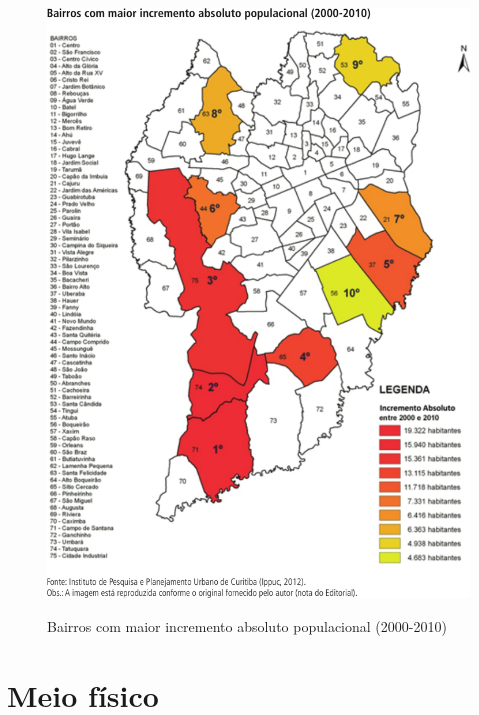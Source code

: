 	\begin{figure}
		\centering
		\caption{Bairros com maior incremento absoluto populacional (2000-2010)}
		\includegraphics[width=1.0\linewidth]{img/costa2015a_04}
		\label{fig:costa2015a_04}
	\end{figure}
    
	\section{Meio físico}
	
